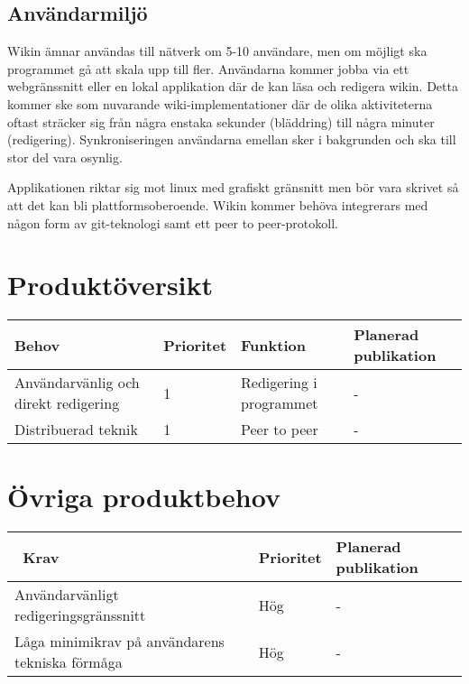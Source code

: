 \subsection{Användarmiljö}
Wikin ämnar användas till nätverk om 5-10 användare, men om möjligt ska programmet gå att skala upp till fler. Användarna kommer jobba via ett webgränssnitt eller en lokal applikation där de kan läsa och redigera wikin. Detta kommer ske som nuvarande wiki-implementationer där de olika aktiviteterna oftast sträcker sig från några enstaka sekunder (bläddring) till några minuter (redigering). Synkroniseringen användarna emellan sker i bakgrunden och ska till stor del vara osynlig.

Applikationen riktar sig mot linux med grafiskt gränsnitt men bör vara skrivet så att det kan bli plattformsoberoende. Wikin kommer behöva integrerars med någon form av git-teknologi samt ett peer to peer-protokoll.
\section{Produktöversikt}
\begin{tabular}{|l|l|l|l|}
\hline
Behov & Prioritet & Funktion & Planerad publikation \\
\hline
Användarvänlig och direkt redigering & 1 & Redigering i programmet & - \\
\hline
Distribuerad teknik & 1 & Peer to peer & - \\
\hline
\end{tabular}
\section{Övriga produktbehov}
\begin{tabular}{|l|l|l|}
\hline\
Krav & Prioritet & Planerad publikation \\
\hline
Användarvänligt redigeringsgränssnitt & Hög & - \\
\hline
Låga minimikrav på användarens tekniska förmåga & Hög & - \\
\hline
\end{tabular}



